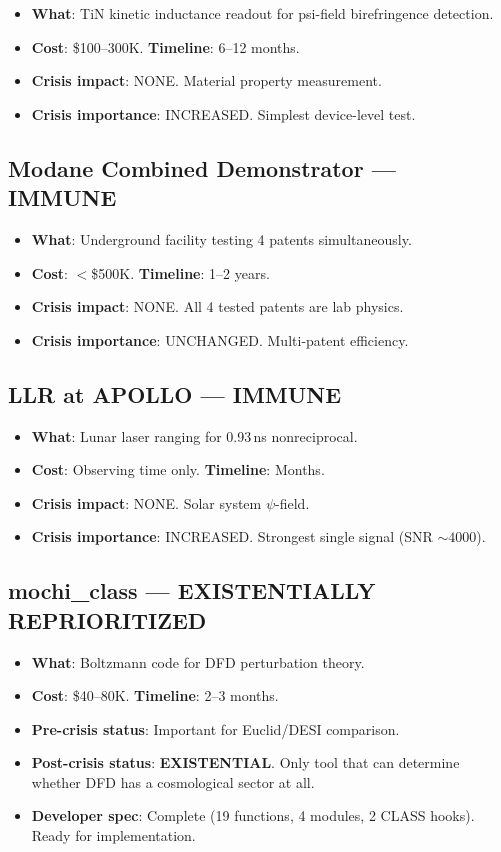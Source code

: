 \documentclass[11pt]{article}
\begin{document}
\begin{itemize}
\item \textbf{What}: TiN kinetic inductance readout for psi-field
  birefringence detection.
\item \textbf{Cost}: \$100--300K. \textbf{Timeline}: 6--12 months.
\item \textbf{Crisis impact}: NONE. Material property measurement.
\item \textbf{Crisis importance}: INCREASED. Simplest device-level test.
\end{itemize}

\subsection{Modane Combined Demonstrator --- IMMUNE}

\begin{itemize}
\item \textbf{What}: Underground facility testing 4 patents simultaneously.
\item \textbf{Cost}: $<$\$500K. \textbf{Timeline}: 1--2 years.
\item \textbf{Crisis impact}: NONE. All 4 tested patents are lab physics.
\item \textbf{Crisis importance}: UNCHANGED. Multi-patent efficiency.
\end{itemize}

\subsection{LLR at APOLLO --- IMMUNE}

\begin{itemize}
\item \textbf{What}: Lunar laser ranging for 0.93\,ns nonreciprocal.
\item \textbf{Cost}: Observing time only. \textbf{Timeline}: Months.
\item \textbf{Crisis impact}: NONE. Solar system $\psi$-field.
\item \textbf{Crisis importance}: INCREASED. Strongest single signal
  (SNR $\sim 4000$).
\end{itemize}

\subsection{mochi\_class --- EXISTENTIALLY REPRIORITIZED}

\begin{itemize}
\item \textbf{What}: Boltzmann code for DFD perturbation theory.
\item \textbf{Cost}: \$40--80K. \textbf{Timeline}: 2--3 months.
\item \textbf{Pre-crisis status}: Important for Euclid/DESI comparison.
\item \textbf{Post-crisis status}: \textbf{EXISTENTIAL}. Only tool that
  can determine whether DFD has a cosmological sector at all.
\item \textbf{Developer spec}: Complete (19 functions, 4 modules, 2
  CLASS hooks). Ready for implementation.
\end{itemize}
\end{document}
